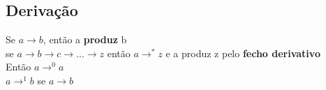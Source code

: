 \documentclass[]{article}
\begin{document}
%	
		\subsection{Derivação}
			Se $a \to b$, então a \textbf{produz} b\\
			se $a\to b\to c \to$...$\to z$ então $a \to ^* z$ e a produz z pelo \textbf{fecho derivativo}\\
			Então $a\to ^0 a$\\
			$a\to ^1 b$ se $a\to b$\\
\end{document}
